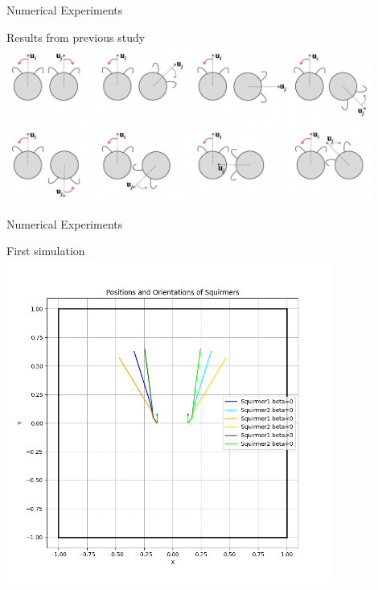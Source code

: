 \documentclass{beamer}
\begin{document}
    

\begin{frame}{Numerical Experiments}
    \begin{center}
        Results from previous study \cite{Stark}
        \includegraphics[width=0.9\textwidth]{../images/stark_behavior.png}
        \cite{Stark}
    \end{center}
\end{frame}

\begin{frame}{Numerical Experiments}
    \begin{center}
        First simulation
        \includegraphics[width=0.8\textwidth]{../../graphs/simulations/twosquirmerinter/sq2.pi.2.png}
    \end{center}
\end{frame}
\end{document}
